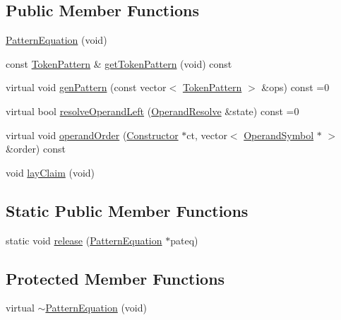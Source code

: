 \subsection*{Public Member Functions}
\begin{DoxyCompactItemize}
\item 
\mbox{\hyperlink{class_pattern_equation_a54761134a1874653c6d86dd66bb16fe2}{Pattern\+Equation}} (void)
\item 
const \mbox{\hyperlink{class_token_pattern}{Token\+Pattern}} \& \mbox{\hyperlink{class_pattern_equation_a99e0416a51f10f4291087173a321dc55}{get\+Token\+Pattern}} (void) const
\item 
virtual void \mbox{\hyperlink{class_pattern_equation_a9838e5bfe5b6013c99567628a6364bfd}{gen\+Pattern}} (const vector$<$ \mbox{\hyperlink{class_token_pattern}{Token\+Pattern}} $>$ \&ops) const =0
\item 
virtual bool \mbox{\hyperlink{class_pattern_equation_a16e885a945df91e3daf2dea6394ae6f2}{resolve\+Operand\+Left}} (\mbox{\hyperlink{struct_operand_resolve}{Operand\+Resolve}} \&state) const =0
\item 
virtual void \mbox{\hyperlink{class_pattern_equation_a944d7114e5d5b6876352e555cc060829}{operand\+Order}} (\mbox{\hyperlink{class_constructor}{Constructor}} $\ast$ct, vector$<$ \mbox{\hyperlink{class_operand_symbol}{Operand\+Symbol}} $\ast$ $>$ \&order) const
\item 
void \mbox{\hyperlink{class_pattern_equation_a1c5807ba6c66f6c089d9fcc39140f187}{lay\+Claim}} (void)
\end{DoxyCompactItemize}
\subsection*{Static Public Member Functions}
\begin{DoxyCompactItemize}
\item 
static void \mbox{\hyperlink{class_pattern_equation_ab810cb4b0638eb2d9413a3d17af56c11}{release}} (\mbox{\hyperlink{class_pattern_equation}{Pattern\+Equation}} $\ast$pateq)
\end{DoxyCompactItemize}
\subsection*{Protected Member Functions}
\begin{DoxyCompactItemize}
\item 
virtual \mbox{\hyperlink{class_pattern_equation_a79801edb8a3dc404e183f2f9066944f5}{$\sim$\+Pattern\+Equation}} (void)
\end{DoxyCompactItemize}
